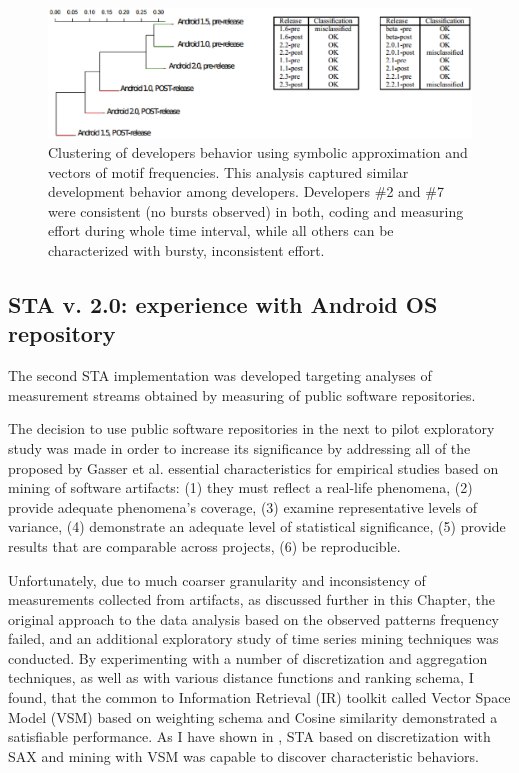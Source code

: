\begin{figure}[t]
   \centering
   \includegraphics[width=145mm]{figures/STA2-draft.eps}
   \caption{Clustering of developers behavior using symbolic approximation and vectors of motif frequencies. 
   This analysis captured similar development behavior among developers. 
   Developers \#2 and \#7 were consistent (no bursts observed) in both, coding and measuring effort during whole time interval, 
   while all others can be characterized with bursty, inconsistent effort.}
   \label{fig:STA2-results}
\end{figure}

\subsection{STA v. 2.0: experience with Android OS repository}
The second STA implementation was developed targeting analyses of measurement streams obtained by measuring of public
software repositories.

The decision to use public software repositories in the next to pilot exploratory study was made in order to increase its 
significance by addressing all of the proposed by Gasser et al. \cite{citeulike:13058334} essential characteristics for 
empirical studies based on mining of software artifacts:  
(1) they must reflect a real-life phenomena, 
(2) provide adequate phenomena's coverage, 
(3) examine representative levels of variance, 
(4) demonstrate an adequate level of statistical significance,
(5) provide results that are comparable across projects,
(6) be reproducible. 

Unfortunately, due to much coarser granularity and inconsistency of measurements collected from artifacts, as discussed 
further in this Chapter, the original approach to the data analysis based on the observed patterns frequency failed, 
and an additional exploratory study of time series mining techniques was conducted.
By experimenting with a number of discretization and aggregation techniques, as well as with various
distance functions and ranking schema, I found, that the common to Information Retrieval (IR) toolkit called 
Vector Space Model (VSM) based on \tfidf weighting schema and Cosine similarity demonstrated a satisfiable performance. 
As I have shown in \cite{csdl2-11-10}, STA based on discretization with SAX and mining with VSM was capable to discover 
characteristic behaviors.


